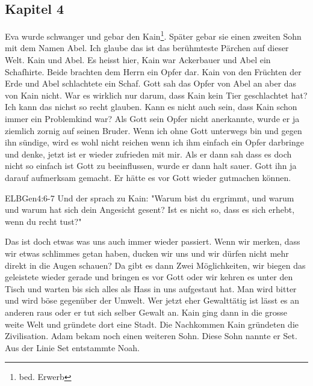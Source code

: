 \subsection{Kapitel 4}
Eva wurde schwanger und gebar den Kain\footnote{bed. Erwerb}. Später gebar sie einen zweiten Sohn mit dem Namen Abel. Ich glaube das ist das berühmteste Pärchen auf dieser Welt. Kain und Abel. Es heisst hier, Kain war Ackerbauer und Abel ein Schafhirte. Beide brachten dem Herrn ein Opfer dar. Kain von den Früchten der Erde und Abel schlachtete ein Schaf. Gott sah das Opfer von Abel an aber das von Kain nicht. War es wirklich nur darum, dass Kain kein Tier geschlachtet hat? Ich kann das nichst so recht glauben. Kann es nicht auch sein, dass Kain schon immer ein Problemkind war? Als Gott sein Opfer nicht anerkannte, wurde er ja ziemlich zornig auf seinen Bruder. Wenn ich ohne Gott unterwegs bin und gegen ihn sündige, wird es wohl nicht reichen wenn ich ihm einfach ein Opfer darbringe und denke, jetzt ist er wieder zufrieden mit mir. Als er dann sah dass es doch nicht so einfach ist Gott zu beeinflussen, wurde er dann halt sauer. Gott ihn ja darauf aufmerksam gemacht. Er hätte es vor Gott wieder gutmachen können.
\begin{bibeltext}{ELB}{Gen}{4:6-7}
	Und der \herr{} sprach zu Kain: "Warum bist du ergrimmt, und warum und warum hat sich dein Angesicht gesent? Ist es nicht so, dass es sich erhebt, wenn du recht tust?"
\end{bibeltext}
Das ist doch etwas was uns auch immer wieder passiert. Wenn wir merken, dass wir etwas schlimmes getan haben, ducken wir uns und wir dürfen nicht mehr direkt in die Augen schauen? Da gibt es dann Zwei Möglichkeiten, wir biegen das geleistete wieder gerade und bringen es vor Gott oder wir kehren es unter den Tisch und warten bis sich alles als Hass in uns aufgestaut hat. Man wird bitter und wird böse gegenüber der Umwelt. Wer jetzt eher Gewalttätig ist lässt es an anderen raus oder er tut sich selber Gewalt an. Kain ging dann in die grosse weite Welt und gründete dort eine Stadt. Die Nachkommen Kain gründeten die Zivilisation. Adam bekam noch einen weiteren Sohn. Diese Sohn nannte er Set. Aus der Linie Set entstammte Noah.
